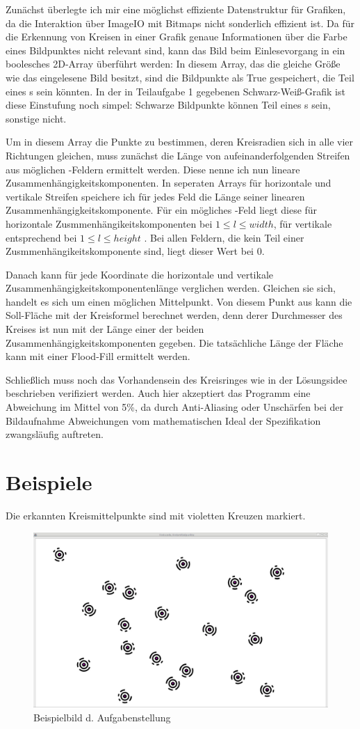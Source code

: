 Zunächst überlegte ich mir eine möglichst effiziente Datenstruktur für Grafiken, da die Interaktion über ImageIO mit Bitmaps nicht sonderlich effizient ist. Da für die Erkennung von Kreisen in einer Grafik genaue Informationen über die Farbe eines Bildpunktes nicht relevant sind, kann das Bild beim Einlesevorgang in ein boolesches 2D-Array überführt werden: In diesem Array, das die gleiche Größe wie das eingelesene Bild besitzt, sind die Bildpunkte als True gespeichert, die Teil eines \task{}s sein könnten. In der in Teilaufgabe 1 gegebenen Schwarz-Weiß-Grafik ist diese Einstufung noch simpel: Schwarze Bildpunkte können Teil eines \task{}s sein, sonstige nicht.

Um in diesem Array die Punkte zu bestimmen, deren Kreisradien sich in alle vier Richtungen gleichen, muss zunächst die Länge von aufeinanderfolgenden Streifen aus möglichen \task{}-Feldern ermittelt werden. Diese nenne ich nun lineare Zusammenhängigkeitskomponenten. In seperaten Arrays für horizontale und vertikale Streifen speichere ich für jedes Feld die Länge seiner linearen Zusammenhängigkeitskomponente. Für ein mögliches \task{}-Feld liegt diese für horizontale Zusmmenhängikeitskomponenten bei \(1 \le l \le width\), für vertikale entsprechend bei
\(1 \le l \le height\)
. Bei allen Feldern, die kein Teil einer Zusmmenhängikeitskomponente sind, liegt dieser Wert bei 0. 

Danach kann für jede Koordinate die horizontale und vertikale Zusammenhängigkeitskomponentenlänge verglichen werden. Gleichen sie sich, handelt es sich um einen möglichen Mittelpunkt. Von diesem Punkt aus kann die Soll-Fläche mit der Kreisformel berechnet werden, denn derer Durchmesser des Kreises ist nun mit der Länge einer der beiden Zusammenhängigkeitskomponenten gegeben. Die tatsächliche Länge der Fläche kann mit einer Flood-Fill ermittelt werden.

Schließlich muss noch das Vorhandensein des Kreisringes wie in der Lösungsidee beschrieben verifiziert werden. Auch hier akzeptiert das Programm eine Abweichung im Mittel von 5\%, da durch Anti-Aliasing oder Unschärfen bei der Bildaufnahme Abweichungen vom mathematischen Ideal der Spezifikation zwangsläufig auftreten.
\pagebreak
\section{Beispiele}
Die erkannten Kreismittelpunkte sind mit violetten Kreuzen markiert.
\begin{figure}[!ht]
	\centering	
	\includegraphics[width=\textwidth]{sek1bsp1}
	\caption{Beispielbild d. Aufgabenstellung}
\end{figure}